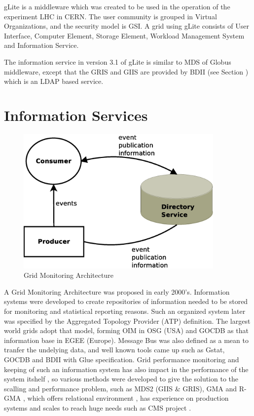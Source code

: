gLite is a middleware which was created to be used in the operation of the experiment LHC in CERN. The user community is grouped in Virtual Organizations, and the security model is GSI. A grid using gLite consists of User Interface, Computer Element, Storage Element, Workload Management System and Information Service.

The information service in version 3.1 of gLite is similar to MDS of Globus middleware, except that the GRIS and GIIS are provided by BDII (see Section ) which is an LDAP based service.




\section{Information Services}
\begin{figure}[htb]
\centering
 \includegraphics[width=4in]{images/gma.eps}
\caption{Grid Monitoring Architecture}
\label{figure:gma}
\end{figure}
A Grid Monitoring Architecture \cite{tierney2002grid} was proposed in early 2000's. Information systems were developed to create repositories of information needed to be stored for monitoring and statistical reporting reasons. Such an organized system later was specified by the Aggregated Topology Provider (ATP) definition. The largest world grids adopt that model, forming OIM in OSG (USA) and GOCDB as that information base in EGEE (Europe). Message Bus was also defined as a mean to tranfer the undelying data, and well known tools came up such as Gstat, GOCDB and BDII with Glue specification. Grid performance monitoring and keeping of such an information system has also impact in the performance of the system itshelf \cite{zhang2003performance}, so various methods were developed to give the solution to the scalling and performance problem, such as MDS2 (GIIS \& GRIS), GMA and R-GMA \cite{wilson2004information}, which offers relational environment \cite{fisher2001relational}, has experience on production systems \cite{byrom-production} and scales to reach huge needs such as CMS project \cite{Bonacorsi2004,Byrom}.

